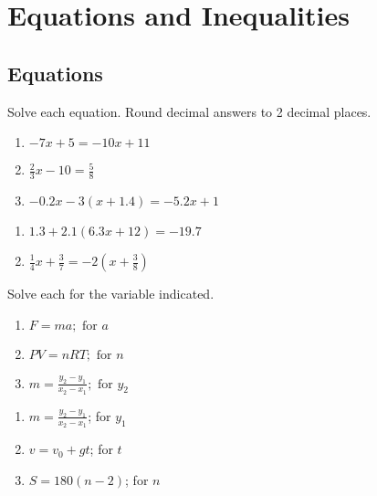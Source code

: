 \chapter{Equations and Inequalities}

\section*{Equations}

Solve each equation. Round decimal answers to 2 decimal places.

\begin{multicols}{3}
\begin{enumerate}
	\item $-7x + 5 = -10x + 11$
	\item $\frac{2}{3}x - 10 = \frac{5}{8}$
	\item $-0.2x - 3(x+1.4) = -5.2x + 1$
\end{enumerate}	\setcounter{Review}{\value{enumi}}
\end{multicols}
\begin{multicols}{3}
\begin{enumerate}	\setcounter{enumi}{\value{Review}}
	\item $1.3 + 2.1(6.3x + 12) = -19.7$
	\item $\frac{1}{4}x + \frac{3}{7} = -2\left(x + \frac{3}{8}\right)$
\end{enumerate}	\setcounter{Review}{\value{enumi}}
\end{multicols}

Solve each for the variable indicated.

\begin{multicols}{3}
\begin{enumerate}	\setcounter{enumi}{\value{Review}}
	\item $F = ma; \text{ for } a$
	\item $PV = nRT; \text{ for } n$
	\item $m = \frac{y_2-y_1}{x_2-x_1}; \text{ for } y_2$
\end{enumerate}	\setcounter{Review}{\value{enumi}}
\end{multicols}
\begin{multicols}{3}
\begin{enumerate}	\setcounter{enumi}{\value{Review}}
	\item $m = \frac{y_2-y_1}{x_2-x_1}$; for $y_1$
    \item $v = v_0 + gt$; for $t$
    \item $S = 180(n-2)$; for $n$
\end{enumerate}	\setcounter{Review}{\value{enumi}}
\end{multicols}




